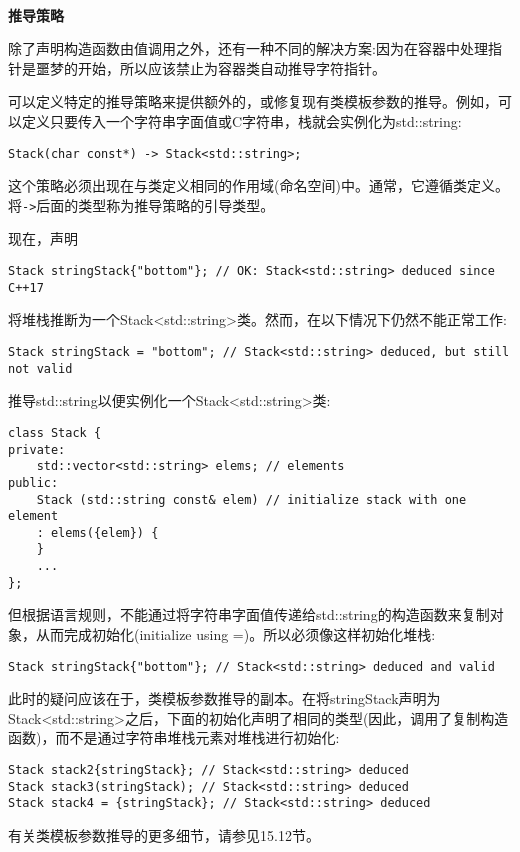 \hspace*{\fill} \\ %
\noindent
\textbf{推导策略}

除了声明构造函数由值调用之外，还有一种不同的解决方案:因为在容器中处理指针是噩梦的开始，所以应该禁止为容器类自动推导字符指针。

可以定义特定的推导策略来提供额外的，或修复现有类模板参数的推导。例如，可以定义只要传入一个字符串字面值或C字符串，栈就会实例化为std::string:

\begin{lstlisting}[style=styleCXX]
Stack(char const*) -> Stack<std::string>;
\end{lstlisting}

这个策略必须出现在与类定义相同的作用域(命名空间)中。通常，它遵循类定义。将\texttt{->}后面的类型称为推导策略的引导类型。

现在，声明

\begin{lstlisting}[style=styleCXX]
Stack stringStack{"bottom"}; // OK: Stack<std::string> deduced since C++17
\end{lstlisting}

将堆栈推断为一个Stack<std::string>类。然而，在以下情况下仍然不能正常工作:

\begin{lstlisting}[style=styleCXX]
Stack stringStack = "bottom"; // Stack<std::string> deduced, but still not valid
\end{lstlisting}

推导std::string以便实例化一个Stack<std::string>类:

\begin{lstlisting}[style=styleCXX]
class Stack {
private:
	std::vector<std::string> elems; // elements
public:
	Stack (std::string const& elem) // initialize stack with one element
	: elems({elem}) {
	}
	...
};
\end{lstlisting}

但根据语言规则，不能通过将字符串字面值传递给std::string的构造函数来复制对象，从而完成初始化(initialize using =)。所以必须像这样初始化堆栈:

\begin{lstlisting}[style=styleCXX]
Stack stringStack{"bottom"}; // Stack<std::string> deduced and valid
\end{lstlisting}

此时的疑问应该在于，类模板参数推导的副本。在将stringStack声明为Stack<std::string>之后，下面的初始化声明了相同的类型(因此，调用了复制构造函数)，而不是通过字符串堆栈元素对堆栈进行初始化:

\begin{lstlisting}[style=styleCXX]
Stack stack2{stringStack}; // Stack<std::string> deduced
Stack stack3(stringStack); // Stack<std::string> deduced
Stack stack4 = {stringStack}; // Stack<std::string> deduced
\end{lstlisting}

有关类模板参数推导的更多细节，请参见15.12节。





















